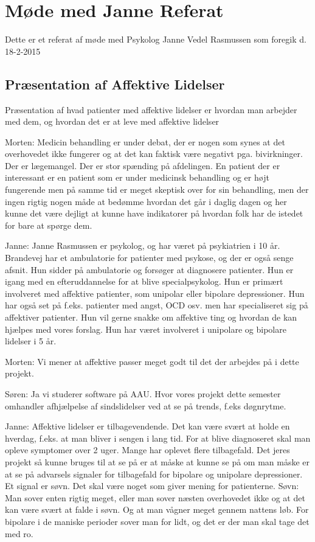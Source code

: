 \chapter{Møde med Janne Referat}\label{app:moede-med-janne-referat}
Dette er et referat af møde med Psykolog Janne Vedel Rasmussen som foregik d. 18-2-2015

\section{Præsentation af Affektive Lidelser}
Præsentation af hvad patienter med affektive lidelser er hvordan man arbejder med dem, og hvordan det er at leve med affektive lidelser

Morten: Medicin behandling er under debat, der er nogen som synes at det overhovedet ikke fungerer og at det kan faktisk være negativt pga. bivirkninger. Der er lægemangel. Der er stor spænding på afdelingen. En patient der er interessant er en patient som er under medicinsk behandling og er højt fungerende men på samme tid er meget skeptisk over for sin behandling, men der ingen rigtig nogen måde at bedømme hvordan det går i daglig dagen og her kunne det være dejligt at kunne have indikatorer på hvordan folk har de istedet for bare at spørge dem. 

Janne: Janne Rasmussen er psykolog, og har været på psykiatrien i 10 år. Brandevej har et ambulatorie for patienter med psykose, og der er også senge afsnit. Hun sidder på ambulatorie og forsøger at diagnosere patienter. Hun er igang med en efteruddannelse for at blive specialpsykolog. Hun er primært involveret med affektive patienter, som unipolar eller bipolare depressioner. Hun har også set på f.eks. patienter med angst, OCD osv. men har specialiseret sig på affektiver patienter. Hun vil gerne snakke om affektive ting og hvordan de kan hjælpes med vores forslag. Hun har været involveret i unipolare og bipolare lidelser i 5 år. 

Morten: Vi mener at affektive passer meget godt til det der arbejdes på i dette projekt. 

Søren: Ja vi studerer software på AAU. Hvor vores projekt dette semester omhandler afhjælpelse af sindslidelser ved at se på trends, f.eks døgnrytme.

Janne: Affektive lidelser er tilbagevendende. Det kan være svært at holde en hverdag, f.eks. at man bliver i sengen i lang tid. For at blive diagnoseret skal man opleve symptomer over 2 uger. Mange har oplevet flere tilbagefald. Det jeres projekt så kunne bruges til at se på er at måske at kunne se på om man måske er at se på advarsels signaler for tilbagefald for bipolare og unipolare depressioner. Et signal er søvn. Det skal være noget som giver mening for patienterne. Søvn: Man sover enten rigtig meget, eller man sover næsten overhovedet ikke og at det kan være svært at falde i søvn. Og at man vågner meget gennem nattens løb. For bipolare i de maniske perioder sover man for lidt, og det er der man skal tage det med ro. 

